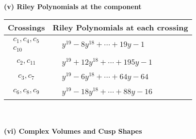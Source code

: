 \documentclass[1p]{elsarticle_modified}
\theoremstyle{definition}
\begin{document}
\newpage\renewcommand{\arraystretch}{1}
\flushleft \textbf{(v) Riley Polynomials at the component}\newline \\
\begin{tabular}{m{50pt}|m{274pt}}
Crossings & \hspace{64pt}Riley Polynomials at each crossing \\
\hline $$\begin{aligned}c_{1},c_{4},c_{5}\\c_{10}\end{aligned}$$&$\begin{aligned}
&y^{19}-8 y^{18}+\cdots+19 y-1
\end{aligned}$\\
\hline $$\begin{aligned}c_{2},c_{11}\end{aligned}$$&$\begin{aligned}
&y^{19}+12 y^{18}+\cdots+195 y-1
\end{aligned}$\\
\hline $$\begin{aligned}c_{3},c_{7}\end{aligned}$$&$\begin{aligned}
&y^{19}-6 y^{18}+\cdots+64 y-64
\end{aligned}$\\
\hline $$\begin{aligned}c_{6},c_{8},c_{9}\end{aligned}$$&$\begin{aligned}
&y^{19}-18 y^{18}+\cdots+88 y-16
\end{aligned}$\\
\hline
\end{tabular}\\~\\
\newpage\flushleft \textbf{(vi) Complex Volumes and Cusp Shapes}
\end{document}
